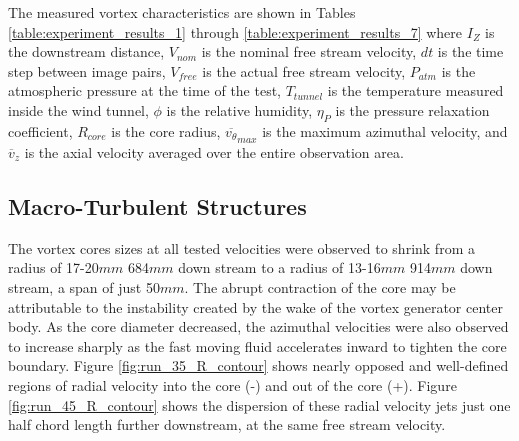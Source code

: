 \vspace{32pt}


The measured vortex characteristics are shown in Tables
\ref{table:experiment_results_1} through \ref{table:experiment_results_7} where 
$I_Z$ is the downstream distance, 
$V_{nom}$ is the nominal free stream velocity, $dt$ is the time step between 
image pairs, $V_{free}$ is the actual free stream velocity, $P_{atm}$ is the 
atmospheric pressure at the time of the test, 
$T_{tunnel}$ is the temperature measured inside the wind tunnel, $\phi$ is the 
relative humidity, $\eta_P$ is the pressure relaxation coefficient, $R_{core}$ 
is the core radius, $\overline{v_{\theta}}_{max}$ 
is the maximum azimuthal velocity, and $\overline{v}_{z}$ is the axial 
velocity averaged over the entire observation area.

\vspace{32pt}








\subsection{Macro-Turbulent Structures}
\label{section:macroturb}

The vortex cores sizes at all tested velocities were observed to shrink from 
a radius of 17-20$mm$ 684$mm$ down stream to a radius of 13-16$mm$ 914$mm$ down 
stream, a span of just 50$mm$. The abrupt contraction of the core 
may be attributable to the instability created by the wake of the vortex 
generator center body. As the core diameter decreased, the azimuthal velocities 
were also observed to increase sharply as the fast moving fluid accelerates 
inward to tighten the core boundary. Figure \ref{fig:run_35_R_contour} shows 
nearly opposed and well-defined regions of radial velocity into the core (-) 
and out of the core (+). Figure \ref{fig:run_45_R_contour} shows the dispersion 
of these radial velocity jets just one half chord length further downstream, at 
the same free stream velocity. 

\vspace{32pt}




